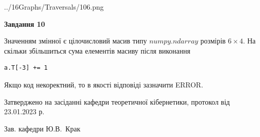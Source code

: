 \documentclass[12pt, ukrainian]{article}
\begin{document}
{\begin {large}
\begin{center}
	{../16Graphs/Traversals/106.png}
\end{center}\par
\newpage

{\begin {center}\textbf{Завдання 10}\end {center}}\par
Значенням змінної  є цілочисловий масив типу $numpy.ndarray$ розмірів $6{\times}4$. На скільки збільшиться сума елементів масиву  після виконання
\begin{verbatim}
a.T[-3] += 1
\end{verbatim}


Якщо код некоректний, то в якості відповіді зазначити ERROR.\par
\newpage


\end {large}
}
{\smallskip \begin {small} Затверджено на засіданні кафедри теоретичної кібернетики, протокол  від   23.01.2023 р.\par\smallskip\smallskip
{\parbox {6.5 cm}{Зав. кафедри \dotfill Ю.В.~Крак}} \end{small}}
\end{document}
